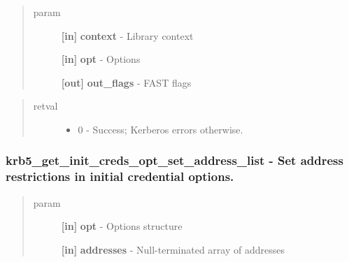 \documentclass[letterpaper,10pt,english]{sphinxmanual}
\begin{document}
\begin{quote}\begin{description}
\item[{param}] \leavevmode
\textbf{{[}in{]}} \textbf{context} - Library context

\textbf{{[}in{]}} \textbf{opt} - Options

\textbf{{[}out{]}} \textbf{out\_flags} - FAST flags

\end{description}\end{quote}
\begin{quote}\begin{description}
\item[{retval}] \leavevmode\begin{itemize}
\item {} 
0   - Success; Kerberos errors otherwise.

\end{itemize}

\end{description}\end{quote}


\subsubsection{krb5\_get\_init\_creds\_opt\_set\_address\_list -  Set address restrictions in initial credential options.}
\label{appdev/refs/api/krb5_get_init_creds_opt_set_address_list:krb5-get-init-creds-opt-set-address-list-set-address-restrictions-in-initial-credential-options}\label{appdev/refs/api/krb5_get_init_creds_opt_set_address_list::doc}

\begin{fulllineitems}
\label{appdev/refs/api/krb5_get_init_creds_opt_set_address_list:c.krb5_get_init_creds_opt_set_address_list}
\end{fulllineitems}

\begin{quote}\begin{description}
\item[{param}] \leavevmode
\textbf{{[}in{]}} \textbf{opt} - Options structure

\textbf{{[}in{]}} \textbf{addresses} - Null-terminated array of addresses

\end{description}\end{quote}
\end{document}
